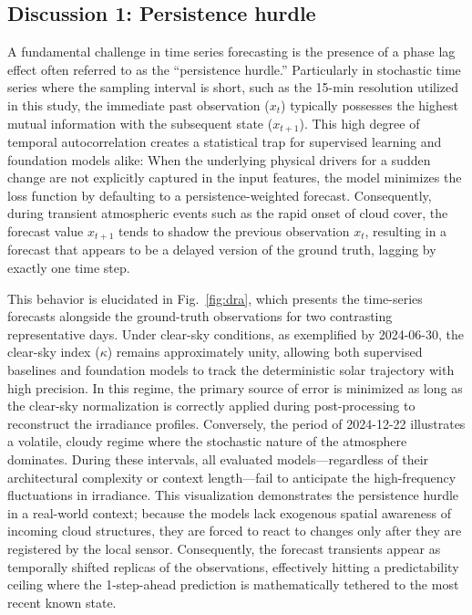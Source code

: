 \documentclass[number, 3p, 10pt, times]{elsarticle}
\begin{document}
\subsection{Discussion 1: Persistence hurdle}
A fundamental challenge in time series forecasting is the presence of a phase lag effect often referred to as the ``persistence hurdle.'' Particularly in stochastic time series where the sampling interval is short, such as the 15-min resolution utilized in this study, the immediate past observation ($x_t$) typically possesses the highest mutual information with the subsequent state ($x_{t+1}$). This high degree of temporal autocorrelation creates a statistical trap for supervised learning and foundation models alike: When the underlying physical drivers for a sudden change are not explicitly captured in the input features, the model minimizes the loss function by defaulting to a persistence-weighted forecast. Consequently, during transient atmospheric events such as the rapid onset of cloud cover, the forecast value $\hat{x}_{t+1}$ tends to shadow the previous observation $x_t$, resulting in a forecast that appears to be a delayed version of the ground truth, lagging by exactly one time step. 

This behavior is elucidated in Fig.~\ref{fig:dra}, which presents the time-series forecasts alongside the ground-truth observations for two contrasting representative days. Under clear-sky conditions, as exemplified by 2024-06-30, the clear-sky index ($\kappa$) remains approximately unity, allowing both supervised baselines and foundation models to track the deterministic solar trajectory with high precision. In this regime, the primary source of error is minimized as long as the clear-sky normalization is correctly applied during post-processing to reconstruct the irradiance profiles. Conversely, the period of 2024-12-22 illustrates a volatile, cloudy regime where the stochastic nature of the atmosphere dominates. During these intervals, all evaluated models---regardless of their architectural complexity or context length---fail to anticipate the high-frequency fluctuations in irradiance. This visualization demonstrates the persistence hurdle in a real-world context; because the models lack exogenous spatial awareness of incoming cloud structures, they are forced to react to changes only after they are registered by the local sensor. Consequently, the forecast transients appear as temporally shifted replicas of the observations, effectively hitting a predictability ceiling where the 1-step-ahead prediction is mathematically tethered to the most recent known state.
\end{document}
